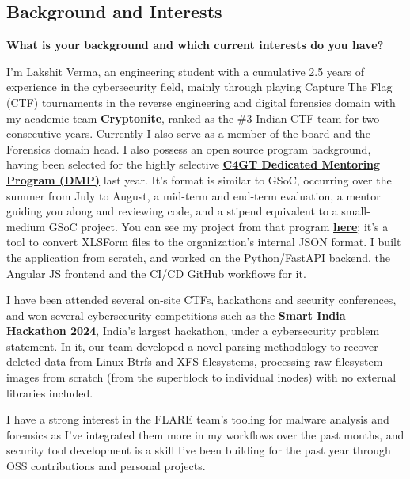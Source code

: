 \documentclass[12pt]{article}
\begin{document}
\subsection*{Background and Interests}
{}

\textbf{What is your background and which current interests do you have?}

I'm Lakshit Verma, an engineering student with a cumulative 2.5 years of experience in the cybersecurity field, mainly through playing Capture The Flag (CTF) tournaments in the reverse engineering and digital forensics domain with my academic team \textbf{\href{https://ctftime.org/team/62713}{Cryptonite}}, ranked as the \#3 Indian CTF team for two consecutive years.
Currently I also serve as a member of the board and the Forensics domain head.
I also possess an open source program background, having been selected for the highly selective \href{https://www.linkedin.com/feed/update/urn:li:activity:7332749666108727296/}{\textbf{C4GT Dedicated Mentoring Program (DMP)}} last year.
It's format is similar to GSoC, occurring over the summer from July to August, a mid-term and end-term evaluation, a mentor guiding you along and reviewing code, and a stipend equivalent to a small-medium GSoC project.
You can see my project from that program \textbf{\href{https://github.com/vee1e/bulk-questionnaire-upload}{here}}; it's a tool to convert XLSForm files to the organization's internal JSON format.
I built the application from scratch, and worked on the Python/FastAPI backend, the Angular JS frontend and the CI/CD GitHub workflows for it.

I have been attended several on-site CTFs, hackathons and security conferences, and won several cybersecurity competitions such as the \textbf{\href{https://www.linkedin.com/posts/lakshitverma_smartindiahackathon2024-teamnitewatch-mitmahe-activity-7273618458590740481-kKHs?utm_source=share&utm_medium=member_desktop&rcm=ACoAAEZUm1oBBRW0ySHd3oHLN9xuTzJSXtxPlv0}{Smart India Hackathon 2024}}, India's largest hackathon, under a cybersecurity problem statement. In it, our team developed a novel parsing methodology to recover deleted data from Linux Btrfs and XFS filesystems, processing raw filesystem images from scratch (from the superblock to individual inodes) with no external libraries included.

I have a strong interest in the FLARE team's tooling for malware analysis and forensics as I've integrated them more in my workflows over the past months, and security tool development is a skill I've been building for the past year through OSS contributions and personal projects.
\end{document}
